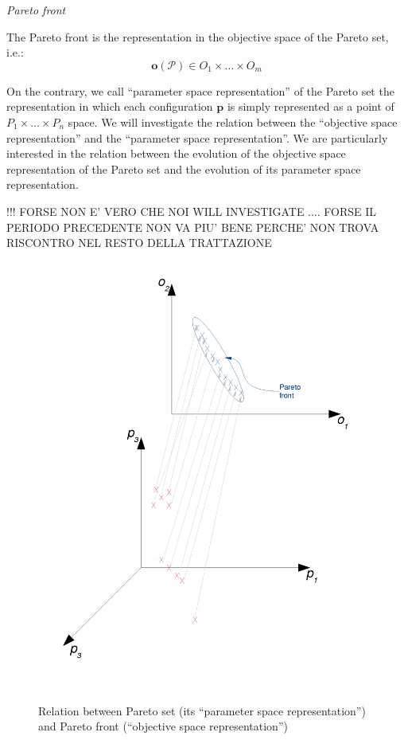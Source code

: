 \begin{defn}
\emph{Pareto front}

The Pareto front is the representation in the objective space of the
Pareto set, i.e.:
\[
\mathbf{o}\left(\mathscr{P}\right)\in O_{1}\times\dots\times O_{m}
\]

\end{defn}
On the contrary, we call ``parameter space representation'' of the
Pareto set the representation in which each configuration $\mathbf{p}$
is simply represented as a point of $P_{1}\times\dots\times P_{n}$
space. We will investigate the relation between the ``objective space
representation'' and the ``parameter space representation''. We
are particularly interested in the relation between the evolution
of the objective space representation of the Pareto set and the evolution
of its parameter space representation.

!!! FORSE NON E' VERO CHE NOI WILL INVESTIGATE .... FORSE IL PERIODO
PRECEDENTE NON VA PIU' BENE PERCHE' NON TROVA RISCONTRO NEL RESTO
DELLA TRATTAZIONE

\begin{figure}[h]
\includegraphics[width=0.9\columnwidth]{img/Pareto_set_and_front}

\caption{Relation between Pareto set (its ``parameter space representation'')
and Pareto front (``objective space representation'')}


\end{figure}

